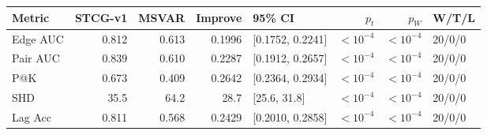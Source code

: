 \begin{tabular}{lrrrlrrl}
\toprule
Metric & STCG-v1 & MSVAR & Improve & 95\% CI & $p_t$ & $p_W$ & W/T/L \\
\midrule
Edge AUC & 0.812 & 0.613 & 0.1996 & [0.1752, 0.2241] & $<10^{-4}$ & $<10^{-4}$ & 20/0/0 \\
Pair AUC & 0.839 & 0.610 & 0.2287 & [0.1912, 0.2657] & $<10^{-4}$ & $<10^{-4}$ & 20/0/0 \\
P@K & 0.673 & 0.409 & 0.2642 & [0.2364, 0.2934] & $<10^{-4}$ & $<10^{-4}$ & 20/0/0 \\
SHD & 35.5 & 64.2 & 28.7 & [25.6, 31.8] & $<10^{-4}$ & $<10^{-4}$ & 20/0/0 \\
Lag Acc & 0.811 & 0.568 & 0.2429 & [0.2010, 0.2858] & $<10^{-4}$ & $<10^{-4}$ & 20/0/0 \\
\bottomrule
\end{tabular}
